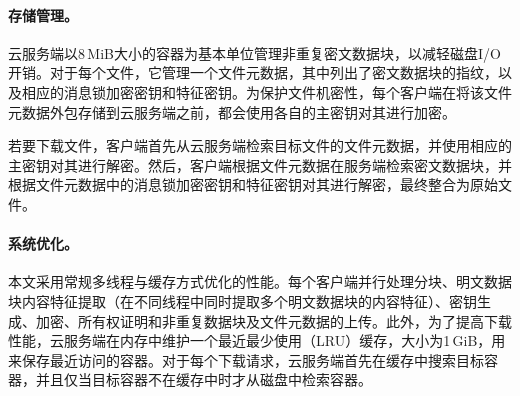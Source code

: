 \paragraph*{存储管理。}
云服务端以8\,MiB大小的容器为基本单位管理非重复密文数据块，以减轻磁盘I/O开销。对于每个文件，它管理一个文件元数据，其中列出了密文数据块的指纹，以及相应的消息锁加密密钥和特征密钥。为保护文件机密性，每个客户端在将该文件元数据外包存储到云服务端之前，都会使用各自的主密钥对其进行加密。

若要下载文件，客户端首先从云服务端检索目标文件的文件元数据，并使用相应的主密钥对其进行解密。然后，客户端根据文件元数据在服务端检索密文数据块，并根据文件元数据中的消息锁加密密钥和特征密钥对其进行解密，最终整合为原始文件。

\paragraph*{系统优化。}
本文采用常规多线程与缓存方式优化\prototype 的性能。每个客户端并行处理分块、明文数据块内容特征提取（在不同线程中同时提取多个明文数据块的内容特征）、密钥生成、加密、所有权证明和非重复数据块及文件元数据的上传。此外，为了提高下载性能，云服务端在内存中维护一个最近最少使用（LRU）缓存，大小为1\,GiB，用来保存最近访问的容器。对于每个下载请求，云服务端首先在缓存中搜索目标容器，并且仅当目标容器不在缓存中时才从磁盘中检索容器。